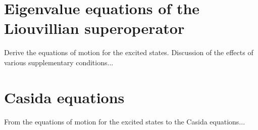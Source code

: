 \documentclass[reprint,aps,prb]{revtex4-1}
\begin{document}
\appendix
\section{Eigenvalue equations of the Liouvillian superoperator}

Derive the equations of motion for the excited states. Discussion of the effects of various supplementary conditions...

\section{Casida equations}

From the equations of motion for the excited states to the Casida equations...


%

\end{document}
